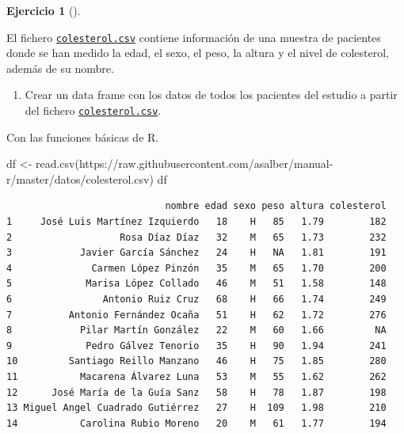 \documentclass[
  a4paper,
]{scrreport}
\newenvironment{Shaded}{\begin{snugshade}}{\end{snugshade}}
\newcommand{\FunctionTok}[1]{\textcolor[rgb]{0.28,0.35,0.67}{#1}}
\newcommand{\NormalTok}[1]{\textcolor[rgb]{0.00,0.23,0.31}{#1}}
\newcommand{\OtherTok}[1]{\textcolor[rgb]{0.00,0.23,0.31}{#1}}
\newcommand{\StringTok}[1]{\textcolor[rgb]{0.13,0.47,0.30}{#1}}
\providecommand{\tightlist}{%
  \setlength{\itemsep}{0pt}\setlength{\parskip}{0pt}}\usepackage{longtable,booktabs,array}
\theoremstyle{definition}
\newtheorem{exercise}{Ejercicio}[chapter]
\theoremstyle{remark}
\begin{document}
\leavevmode{}%
\begin{exercise}[]\label{exr-preprocesamiento-2}

El fichero
\href{\textquotesingle{}https://raw.githubusercontent.com/asalber/manual-r/master/datos/colesterol.csv\textquotesingle{}}{\texttt{colesterol.csv}}
contiene información de una muestra de pacientes donde se han medido la
edad, el sexo, el peso, la altura y el nivel de colesterol, además de su
nombre.

\begin{enumerate}
\def\labelenumi{\alph{enumi}.}
\tightlist
\item
  Crear un data frame con los datos de todos los pacientes del estudio a
  partir del fichero
  \href{(\textquotesingle{}https://raw.githubusercontent.com/asalber/manual-r/master/datos/colesterol.csv\textquotesingle{})}{\texttt{colesterol.csv}}.
\end{enumerate}

\begin{tcolorbox}[enhanced jigsaw, title=\textcolor{quarto-callout-tip-color}{\faLightbulb}\hspace{0.5em}{Solución 1}, coltitle=black, opacitybacktitle=0.6, rightrule=.15mm, colback=white, bottomtitle=1mm, breakable, leftrule=.75mm, opacityback=0, colbacktitle=quarto-callout-tip-color!10!white, left=2mm, colframe=quarto-callout-tip-color-frame, toptitle=1mm, titlerule=0mm, arc=.35mm, bottomrule=.15mm, toprule=.15mm]

Con las funciones básicas de R.

\begin{Shaded}
\begin{Highlighting}[]
\NormalTok{df }\OtherTok{\textless{}{-}} \FunctionTok{read.csv}\NormalTok{(}\StringTok{\textquotesingle{}https://raw.githubusercontent.com/asalber/manual{-}r/master/datos/colesterol.csv\textquotesingle{}}\NormalTok{)}
\NormalTok{df}
\end{Highlighting}
\end{Shaded}

\begin{verbatim}
                            nombre edad sexo peso altura colesterol
1     José Luis Martínez Izquierdo   18    H   85   1.79        182
2                   Rosa Díaz Díaz   32    M   65   1.73        232
3            Javier García Sánchez   24    H   NA   1.81        191
4              Carmen López Pinzón   35    M   65   1.70        200
5             Marisa López Collado   46    M   51   1.58        148
6                Antonio Ruiz Cruz   68    H   66   1.74        249
7          Antonio Fernández Ocaña   51    H   62   1.72        276
8            Pilar Martín González   22    M   60   1.66         NA
9             Pedro Gálvez Tenorio   35    H   90   1.94        241
10         Santiago Reillo Manzano   46    H   75   1.85        280
11           Macarena Álvarez Luna   53    M   55   1.62        262
12      José María de la Guía Sanz   58    H   78   1.87        198
13 Miguel Angel Cuadrado Gutiérrez   27    H  109   1.98        210
14           Carolina Rubio Moreno   20    M   61   1.77        194
\end{verbatim}


\end{tcolorbox}
\end{exercise}
\end{document}
